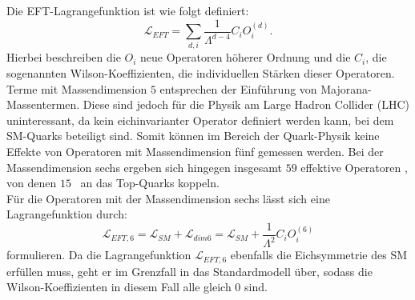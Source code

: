 Die EFT-Lagrangefunktion ist wie folgt definiert:
\begin{equation}
  \mathscr{L}_{EFT} = \sum_{d,i} \frac{1}{\Lambda^{d-4}} C_i O_i^{(d)}.
\end{equation}
Hierbei beschreiben die $O_i$ neue Operatoren höherer Ordnung und die $C_i$, die sogenannten Wilson-Koeffizienten, die individuellen Stärken dieser Operatoren. Terme mit Massendimension $5$ entsprechen der Einführung von Majorana-Massentermen. Diese sind jedoch für die Physik am Large Hadron Collider (LHC) uninteressant, da kein eichinvarianter Operator definiert werden kann, bei dem SM-Quarks beteiligt sind. Somit können im Bereich der Quark-Physik keine Effekte von Operatoren mit Massendimension fünf gemessen werden. Bei der Massendimension sechs ergeben sich hingegen insgesamt $59$ effektive Operatoren \cite{Grzadkowski:2010es}, von denen $15$~\cite{Zhang:2014rja} an das Top-Quarks koppeln.\\
Für die Operatoren mit der Massendimension sechs lässt sich eine Lagrangefunktion durch:
\begin{equation}
  \mathscr{L}_{EFT, 6} = \mathscr{L}_{SM} + \mathscr{L}_{dim6} = \mathscr{L}_{SM} + \frac{1}{\Lambda^{2}} C_i O_i^{(6)}
\end{equation}
formulieren. Da die Lagrangefunktion $\mathscr{L}_{EFT, 6}$ ebenfalls die Eichsymmetrie des SM erfüllen muss, geht er im Grenzfall in das Standardmodell über, sodass die Wilson-Koeffizienten in diesem Fall alle gleich 0 sind.

